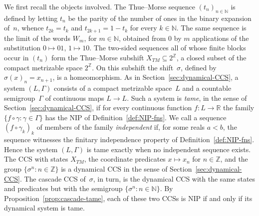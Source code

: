 \documentclass[psamsfonts]{amsart}
\theoremstyle{definition}
\theoremstyle{remark}
\newcommand{\NIP}{\text{NIP}}
\numberwithin{equation}{section}
\begin{document}
We first recall the objects involved.
The Thue--Morse sequence $(t_n)_{n\in\mathbb{N}}$ is defined by letting $t_n$ be the parity of the number of ones in the binary expansion of~$n$, whence $t_{2k}=t_k$ and $t_{2k+1}=1-t_k$ for every $k\in\mathbb{N}$.
The same sequence is the limit of the words $W_m$, for $m\in\mathbb{N}$, obtained from $0$ by $m$ applications of the substitution $0\mapsto01$, $1\mapsto10$.
The two-sided sequences all of whose finite blocks occur in $(t_n)$ form the Thue--Morse subshift $X_{TM}\subseteq2^{\mathbb{Z}}$, a closed subset of the compact metrizable space $2^{\mathbb{Z}}$.
On this subshift the shift~$\sigma$, defined by $\sigma(x)_n=x_{n+1}$, is a homeomorphism.
As in Section~\ref{sec:dynamical-CCS}, a system $(L,\Gamma)$ consists of a compact metrizable space~$L$ and a countable semigroup~$\Gamma$ of continuous maps $L\to L$.
Such a system is \emph{tame}, in the sense of Section~\ref{sec:dynamical-CCS}, if for every continuous function $f\colon L\to\mathbb{R}$ the family $\{f\circ\gamma:\gamma\in\Gamma\}$ has the $\NIP$ of Definition~\ref{def:NIP-fns}.
We call a sequence $(f\circ\gamma_k)_k$ of members of the family \emph{independent} if, for some reals $a<b$, the sequence witnesses the finitary independence property of Definition~\ref{def:NIP-fns}.
Hence the system $(L,\Gamma)$ is tame exactly when no independent sequence exists.
The CCS with states $X_{TM}$, the coordinate predicates $x\mapsto x_n$ for $n\in\mathbb{Z}$, and the group $\{\sigma^n:n\in\mathbb{Z}\}$ is a dynamical CCS in the sense of Section~\ref{sec:dynamical-CCS}.
The cascade CCS of~$\sigma$, in turn, is the dynamical CCS with the same states and predicates but with the semigroup $\{\sigma^n:n\in\mathbb{N}\}$.
By Proposition~\ref{prop:cascade-tame}, each of these two CCSs is $\NIP$ if and only if its dynamical system is tame.
\end{document}
